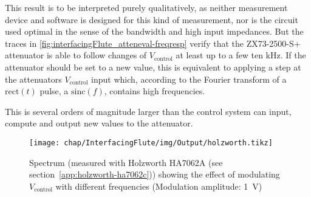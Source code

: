 This result is to be interpreted purely qualitatively, as neither measurement device and software is designed for this kind of measurement, nor is the circuit used optimal in the sense of the bandwidth and high input impedances.
But the traces in \autoref{fig:interfacingFlute_atteneval-freqresp} verify that the ZX73-2500-S+ attenuator is able to follow changes of $V_\text{control}$ at least up to a few ten \si{\kHz}. If the attenuator should be set to a new value, this is equivalent to applying a step at the attenuators $V_\text{control}$ input which, according to the Fourier transform of a $\text{rect}(t)$ pulse, a $\text{sinc}(f)$, contains high frequencies.

This is several orders of magnitude larger than the control system can input, compute and output new values to the attenuator.

\begin{figure}[H]
	\centering
	\texttt{[image: chap/InterfacingFlute/img/Output/holzworth.tikz]}
	\caption[Spectrum showing maximum modulation speed]{Spectrum (measured with Holzworth HA7062A (see section~\ref{app:holzworth-ha7062c})) showing the effect of modulating $V_\text{control}$ with different frequencies (Modulation amplitude: \SI{1}{\volt})}
	\label{fig:interfacingFlute_atteneval-freqresp}
\end{figure}

\newpage
